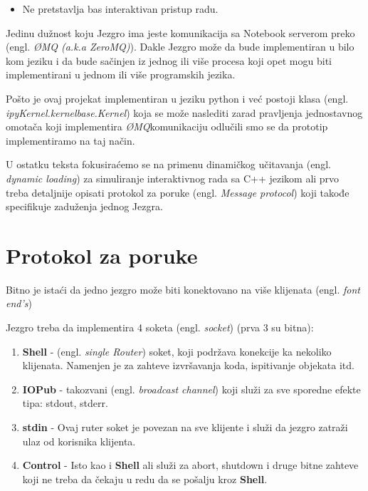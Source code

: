 \documentclass[a4paper]{article}
\newcommand{\eng}[1]{(engl. \textit{#1})}
\newcommand{\zMQ}[0]{\textit{ØMQ}}
\begin{document}
{\begin{itemize}
    \item Ne pretstavlja bas interaktivan pristup radu.
\end{itemize}

Jedinu dužnost koju  Jezgro ima jeste komunikacija sa Notebook serverom preko \eng{ ØMQ (a.k.a ZeroMQ)}.
Dakle Jezgro može da bude implementiran u bilo kom jeziku i da bude sačinjen iz jednog ili više procesa
koji opet mogu biti implementirani u jednom ili više programskih jezika. 

Pošto je ovaj projekat implementiran u jeziku python i već postoji klasa \eng{ipyKernel.kernelbase.Kernel}
koja se može naslediti zarad pravljenja jednostavnog omotača koji implementira \zMQ  komunikaciju odlučili
smo se da prototip implementiramo na taj način. \cite{IPython}

U ostatku teksta fokusiraćemo se na primenu dinamičkog učitavanja \eng{dynamic loading} za simuliranje
interaktivnog rada sa C++ jezikom ali prvo treba detaljnije opisati protokol za poruke \eng{Message protocol}
koji takođe specifikuje zaduženja jednog Jezgra.



\section{Protokol za poruke}
\label{sec:Poruke}

Bitno je istaći da jedno jezgro može biti konektovano na više klijenata \eng{font end's} \cite{IPython}

Jezgro treba da implementira 4 soketa \eng{socket} (prva 3 su bitna): \cite{Ipython}
\begin {enumerate}
\item \textbf{Shell} - \eng{single Router} soket, koji podržava konekcije ka nekoliko
  klijenata. Namenjen je za zahteve izvršavanja koda, ispitivanje objekata itd.

\item \textbf{IOPub} - takozvani  \eng{broadcast channel} koji služi za sve sporedne
  efekte tipa: stdout, stderr.

\item \textbf{stdin} - Ovaj ruter soket je povezan na sve klijente i služi da
  jezgro zatraži ulaz od korisnika klijenta.

\item \textbf{Control} - Isto kao i \textbf{Shell} ali služi za abort, shutdown i
  druge bitne zahteve koji ne treba da čekaju u redu da se pošalju kroz \textbf{Shell}.
\end {enumerate}


}
\end{document}
